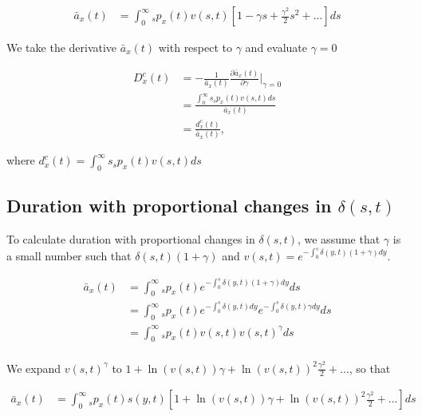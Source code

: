 \documentclass[12pt]{article}
\begin{document}
\begin{equation}\label{eq:DurationConst1}
\begin{split}
\bar{a}_{x}(t) &= \int_0^\infty {}_sp_x(t) {v}(s,t)[1-\gamma s+\frac{\gamma^2}{2} s^{2} +...]ds
\end{split}
\end{equation}

We take the derivative $\bar{a}_{x}(t)$ with respect to $\gamma$ and evaluate $\gamma=0$


\begin{equation}\label{eq:DurationConst2}
\begin{split}
{D}^{c}_x(t)&=-\frac{1}{\bar{a}_x(t)}\frac{\partial \bar{a}_x(t)}{\partial \gamma} \bigg\rvert_{\gamma=0}\\
              &= \frac{\int_0^\infty s {}_sp_x(t) {v}(s,t)ds}{\bar{a}_x(t)} \\
              &= \frac{{d}^{c}_x(t)}{\bar{a}_x(t)},
\end{split}
\end{equation}

where ${d}^{c}_x(t)=\int_0^\infty s {}_sp_x(t) {v}(s,t)ds$



\subsection{Duration with proportional changes in $\delta(s,t)$}

To calculate duration with proportional changes in $\delta(s,t)$, we assume that $\gamma$ is a small number such that $\delta(s,t)(1+\gamma)$ and  ${v}(s,t)=e^{-\int_0^{s}  \delta(y,t)(1+\gamma)dy}$.


\begin{equation}\label{eq:DurationProp1}
\begin{split}
\bar{a} _x(t) &= \int_0^\infty {}_sp_x(t) e^{-\int_0^{s}\delta(y,t)(1+\gamma)dy}ds \\
&= \int_0^\infty {}_sp_x(t) e^{-\int_0^{s}\delta(y,t)dy}e^{-\int_0^{s}\delta(y,t)\gamma dy}ds \\
&= \int_0^\infty {}_sp_x(t) v(s,t)v(s,t)^{\gamma}ds \\
\end{split}
\end{equation}


We expand $v(s,t)^{\gamma}$ to $1+\ln(v(s,t)) \gamma+{\ln(v(s,t))}^2 \frac{\gamma^2}{2}+...$, so that


\begin{equation}\label{eq:DurationProp2}
\begin{split}
\bar{a}_x(t) &= \int_0^\infty {}_sp_x(t) s(y,t)[1+\ln(v(s,t)) \gamma+{\ln(v(s,t))}^2 \frac{\gamma^2}{2}+...]ds\\
\end{split}
\end{equation}
\end{document}
